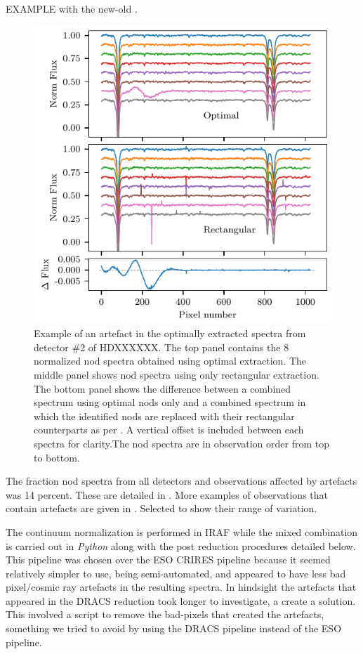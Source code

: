 EXAMPLE with the new-old .
\begin{figure}
    \centering
    \includegraphics[width=\hsize/2]{figures/reduction/Bad_pixel_replacement}
    \caption{Example of an artefact in the optimally extracted spectra from detector \#2 of {\red{} HDXXXXXX}. The top panel contains the 8 normalized nod spectra obtained using optimal extraction. The middle panel shows nod spectra using only rectangular extraction. The bottom panel shows the difference between a combined spectrum using optimal nods only and a combined spectrum in which the identified nods are replaced with their rectangular counterparts as per . A vertical offset is included between each spectra for clarity.The nod spectra are in observation order from top to bottom.}
    \label{fig:badpixelreplacement}
\end{figure}

The fraction nod spectra from all detectors and observations affected by artefacts was 14 percent. These are detailed in . More examples of observations that contain artefacts are given in . Selected to show their range of variation.


The continuum normalization is performed in {IRAF} while the mixed combination is carried out in \emph{Python} along with the post reduction procedures detailed below. This pipeline was chosen over the {ESO} {CRIRES} pipeline because it seemed relatively simpler to use, being semi-automated, and appeared to have less bad pixel/cosmic ray artefacts in the resulting spectra. In hindsight the artefacts that appeared in the {DRACS} reduction took longer to investigate, a create a solution. This involved a script to remove the bad-pixels that created the artefacts, something we tried to avoid by using the {DRACS} pipeline instead of the {ESO} pipeline.

